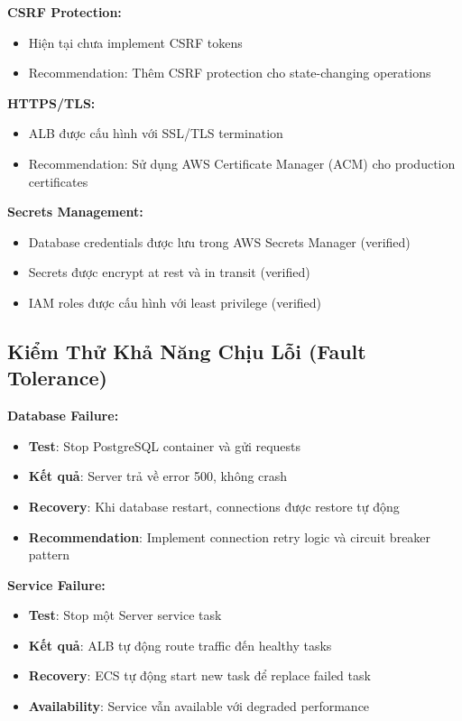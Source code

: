 \textbf{CSRF Protection:}
\begin{itemize}
    \item Hiện tại chưa implement CSRF tokens
    \item Recommendation: Thêm CSRF protection cho state-changing operations
\end{itemize}

\textbf{HTTPS/TLS:}
\begin{itemize}
    \item ALB được cấu hình với SSL/TLS termination
    \item Recommendation: Sử dụng AWS Certificate Manager (ACM) cho production certificates
\end{itemize}

\textbf{Secrets Management:}
\begin{itemize}
    \item Database credentials được lưu trong AWS Secrets Manager (verified)
    \item Secrets được encrypt at rest và in transit (verified)
    \item IAM roles được cấu hình với least privilege (verified)
\end{itemize}

\subsection{Kiểm Thử Khả Năng Chịu Lỗi (Fault Tolerance)}

\textbf{Database Failure:}
\begin{itemize}
    \item \textbf{Test}: Stop PostgreSQL container và gửi requests
    \item \textbf{Kết quả}: Server trả về error 500, không crash
    \item \textbf{Recovery}: Khi database restart, connections được restore tự động
    \item \textbf{Recommendation}: Implement connection retry logic và circuit breaker pattern
\end{itemize}

\textbf{Service Failure:}
\begin{itemize}
    \item \textbf{Test}: Stop một Server service task
    \item \textbf{Kết quả}: ALB tự động route traffic đến healthy tasks
    \item \textbf{Recovery}: ECS tự động start new task để replace failed task
    \item \textbf{Availability}: Service vẫn available với degraded performance
\end{itemize}

